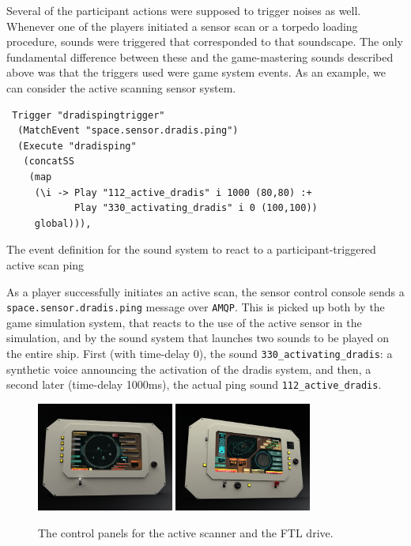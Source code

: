 Several of the participant actions were supposed to trigger noises as well. Whenever one of the players initiated a sensor scan or a torpedo loading procedure, sounds were triggered that corresponded to that soundscape. The only fundamental difference between these and the game-mastering sounds described above was that the triggers used were game system events. As an example, we can consider the active scanning sensor system.

\begin{listing}
\begin{verbatim}
 Trigger "dradispingtrigger" 
  (MatchEvent "space.sensor.dradis.ping") 
  (Execute "dradisping" 
   (concatSS 
    (map 
     (\i -> Play "112_active_dradis" i 1000 (80,80) :+ 
            Play "330_activating_dradis" i 0 (100,100)) 
     global))),
\end{verbatim}
\caption{The event definition for the sound system to react to a participant-triggered
  active scan ping}
\end{listing}

As a player successfully initiates an active scan, the sensor control console sends a \texttt{space.sensor.dradis.ping} message over \texttt{AMQP}. This is picked up both by the game simulation system, that reacts to the use of the active sensor in the simulation, and by the sound system that launches two sounds to be played on the entire ship. First (with time-delay 0), the sound \texttt{330\_activating\_dradis}: a synthetic voice announcing the activation of the dradis system, and then, a second later (time-delay 1000ms), the actual ping sound \texttt{112\_active\_dradis}.

\begin{figure}
  \includegraphics[width=0.4\textwidth]{img/Dradis.jpg}\hfill
  \includegraphics[width=0.4\textwidth]{img/Helm.jpg}
  \vspace{1em}
  \caption{The control panels for the active scanner and the FTL drive.}
  \label{fig:dradis}
\end{figure}


